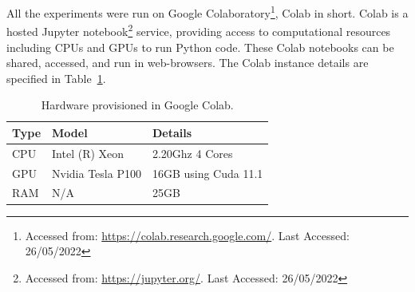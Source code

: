 All the experiments were run on Google Colaboratory\footnote{Accessed from: \url{https://colab.research.google.com/}. Last Accessed: 26/05/2022}, Colab in short. Colab is a hosted Jupyter notebook\footnote{Accessed from: \url{https://jupyter.org/}. Last Accessed: 26/05/2022} service, providing access to computational resources including CPUs and GPUs to run Python code. These Colab notebooks can be shared, accessed, and run in web-browsers.  The Colab instance details are specified in Table~\ref{tab:hardware}.

\begin{table}
	\centering
	\begin{tabular}{@{}lll@{}}
		\hline
		\textbf{Type} & \textbf{Model} & \textbf{Details} \\
		\hline
		CPU & Intel (R) Xeon & 2.20Ghz 4 Cores \\
		GPU & Nvidia Tesla P100 & 16GB using Cuda 11.1 \\
		RAM & N/A & 25GB \\
		\hline
	\end{tabular}
	\caption{Hardware provisioned in Google Colab.}
	\label{tab:hardware}
\end{table}

